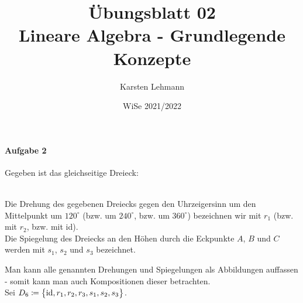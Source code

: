 \documentclass{scrreprt}
\author{Karsten Lehmann}
\date{WiSe 2021/2022}
\title{Übungsblatt 02\\Lineare Algebra - Grundlegende Konzepte}
\begin{document}
\paragraph{Aufgabe 2} Gegeben ist das gleichseitige Dreieck:

 \\
Die Drehung des gegebenen Dreiecks gegen den Uhrzeigersinn um den Mittelpunkt
um $120^{\circ}$ (bzw. um $240^{\circ}$, bzw. um $360^{\circ}$) bezeichnen wir
mit $r_1$ (bzw. mit $r_2$, bzw. mit id). \\
Die Spiegelung des Dreiecks an den Höhen durch die Eckpunkte $A$, $B$ und $C$
werden mit $s_1$, $s_2$ und $s_3$ bezeichnet.

Man kann alle genannten Drehungen und Spiegelungen als Abbildungen auffassen -
somit kann man auch Kompositionen dieser betrachten. \\
Sei $D_6 \coloneqq \qty\big{\text{id}, r_1, r_2, r_3, s_1, s_2, s_3}$.
\end{document}

